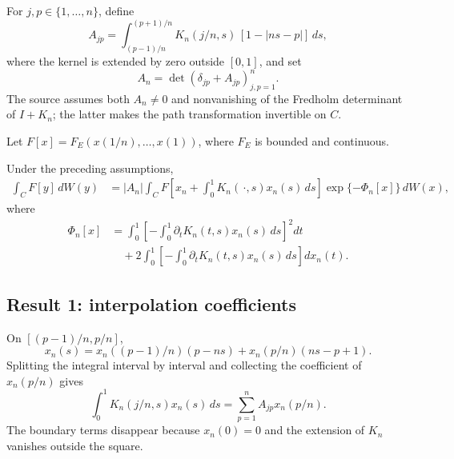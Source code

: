 For \(j,p\in\{1,\ldots,n\}\), define
\begin{equation}
 A_{jp}=\int_{(p-1)/n}^{(p+1)/n}
 K_n(j/n,s)\,[1-|ns-p|] \,ds,
 \tag{1.3}\label{eq:CM-Ajp}
\end{equation}
where the kernel is extended by zero outside \([0,1]\), and set
\[
 A_n=\det(\delta_{jp}+A_{jp})_{j,p=1}^n.
\]
The source assumes both \(A_n\ne0\) and nonvanishing of the Fredholm determinant of \(I+K_n\); the latter makes the path transformation invertible on \(C\).

Let \(F[x]=F_E(x(1/n),\ldots,x(1))\), where \(F_E\) is bounded and continuous.

\begin{lemma}[Lemma 1]
Under the preceding assumptions,
\begin{align}
 \int_CF[y]\,dW(y)
 &=|A_n|\int_C
 F\left[x_n+\int_0^1K_n(\,\cdot,s)x_n(s)\,ds\right]
 \exp\{-\Phi_n[x]\}\,dW(x),
 \tag{1.6}\label{eq:CM-L1}
\end{align}
where
\begin{align*}
 \Phi_n[x]
 &=\int_0^1\left[-\int_0^1\partial_tK_n(t,s)x_n(s)\,ds\right]^2dt\\
 &\quad+2\int_0^1\left[-\int_0^1\partial_tK_n(t,s)x_n(s)\,ds\right]dx_n(t).
\end{align*}
\end{lemma}

\subsection{Result 1: interpolation coefficients}
On \([(p-1)/n,p/n]\),
\[
 x_n(s)=x_n((p-1)/n)(p-ns)+x_n(p/n)(ns-p+1).
\]
Splitting the integral interval by interval and collecting the coefficient of \(x_n(p/n)\) gives
\begin{equation}
 \int_0^1K_n(j/n,s)x_n(s)\,ds
 =\sum_{p=1}^nA_{jp}x_n(p/n).
 \tag{2.1}\label{eq:CM-result1}
\end{equation}
The boundary terms disappear because \(x_n(0)=0\) and the extension of \(K_n\) vanishes outside the square.


